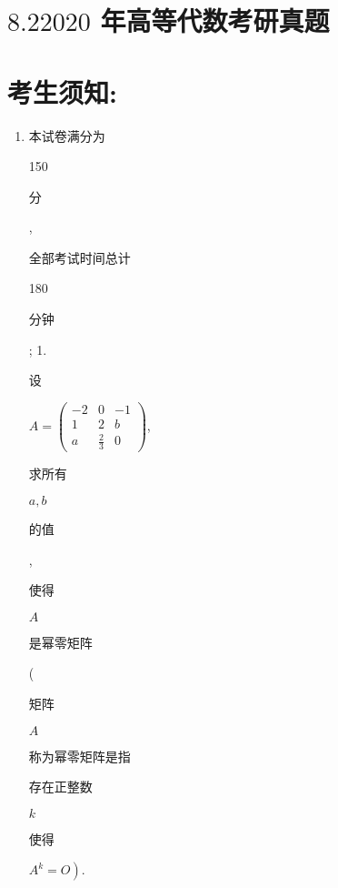 \documentclass[10pt]{article}
\begin{document}
\section{$8.22020$ 年高等代数考研真题}
\section{考生须知:}
\begin{enumerate}
  \item \begin{CJK}{UTF8}{mj}本试卷满分为\end{CJK} 150 \begin{CJK}{UTF8}{mj}分\end{CJK}, \begin{CJK}{UTF8}{mj}全部考试时间总计\end{CJK} 180 \begin{CJK}{UTF8}{mj}分钟\end{CJK}; 1. \begin{CJK}{UTF8}{mj}设\end{CJK} $A=\left(\begin{array}{ccc}-2 & 0 & -1 \\ 1 & 2 & b \\ a & \frac{2}{3} & 0\end{array}\right)$, \begin{CJK}{UTF8}{mj}求所有\end{CJK} $a, b$ \begin{CJK}{UTF8}{mj}的值\end{CJK}, \begin{CJK}{UTF8}{mj}使得\end{CJK} $A$ \begin{CJK}{UTF8}{mj}是幂零矩阵\end{CJK} (\begin{CJK}{UTF8}{mj}矩阵\end{CJK} $A$ \begin{CJK}{UTF8}{mj}称为幂零矩阵是指\end{CJK} \begin{CJK}{UTF8}{mj}存在正整数\end{CJK} $k$ \begin{CJK}{UTF8}{mj}使得\end{CJK} $\left.A^{k}=O\right)$.


\end{enumerate}
\end{document}
